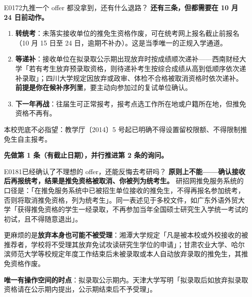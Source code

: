 \begin{qa}{E0172}{九推一个 offer 都没拿到，还有什么退路？}
\textbf{还有三条，但都需要在 10 月 24 日前动作。}
\begin{enumerate}
  \item \textbf{转统考}：未落实接收单位的推免生资格作废，可在统考网上报名截止前报名（10 月 15 日至 24 日，逾期不补办）。这是当季唯一的正规入学通道。
  \item \textbf{等递补}：接收单位在拟录取公示期出现放弃时按成绩顺次递补——西南财经大学「若有考生放弃预录取资格，则待递补考生按综合成绩从高到低顺序依次递补录取」；四川大学规定因放弃或政审、体检不合格被取消资格时依次递补。\textbf{前提是你在候补序列里}，要主动向参加过的复试单位确认。
  \item \textbf{下一年再战}：往届生可正常报考，报考点选工作所在地或户籍所在地，但推免资格不再有。
\end{enumerate}

本校兜底不必指望：教学厅〔2014〕5 号起已明确不得设置留校限额、不得限制推免生自主报考。

\textbf{先做第 1 条（有截止日期），并行推进第 2 条的询问。}
\end{qa}

\begin{qa}{E0181}{已经确认了不理想的 offer，还能反悔去考研吗？}
\textbf{原则上不能——确认接收后再报统考，结果是推免资格被取消、你被列为统考生。}
研招网推免服务系统的口径是：「在推免服务系统中已被招生单位接收的推免生，不得再报名参加统考，否则将取消推免资格，列为统考生」。同一表述见于多校文件，如广东外语外贸大学「获得推免资格的学生一经录取，不再参加当年全国硕士研究生入学统一考试的初试，且不得随意退出」。

更麻烦的是\textbf{放弃本身也可能不被受理}：湘潭大学规定「凡是被本校或外校接收的被推荐者，学校将不受理其放弃免试攻读研究生学位的申请」；甘肃农业大学、哈尔滨师范大学等校规定年度工作结束后未被录取或本人自动放弃录取的推免生，其推免资格作废。

\textbf{唯一有操作空间的时点}：拟录取公示期内。天津大学写明「拟录取后如放弃拟录取资格请在公示期内提出，公示期结束后不予受理」。
\end{qa}

